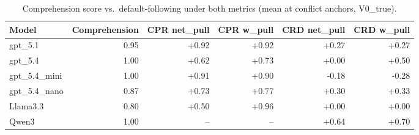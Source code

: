 \begin{table}[t]
\centering
\caption{Comprehension score vs.\ default-following under both metrics (mean at conflict anchors, V0\_true).}
\label{tab:comprehension_wpull}
\small
\begin{tabular}{lrrrrr}
\toprule
Model & Comprehension & CPR net\_pull & CPR w\_pull & CRD net\_pull & CRD w\_pull \\
\midrule
gpt\_5.1 & 0.95 & +0.92 & +0.92 & +0.27 & +0.27 \\
gpt\_5.4 & 1.00 & +0.62 & +0.73 & +0.00 & +0.50 \\
gpt\_5.4\_mini & 1.00 & +0.91 & +0.90 & -0.18 & -0.28 \\
gpt\_5.4\_nano & 0.87 & +0.73 & +0.77 & +0.30 & +0.33 \\
Llama3.3 & 0.80 & +0.50 & +0.96 & +0.00 & +0.00 \\
Qwen3 & 1.00 & -- & -- & +0.64 & +0.70 \\
\bottomrule
\end{tabular}
\end{table}
